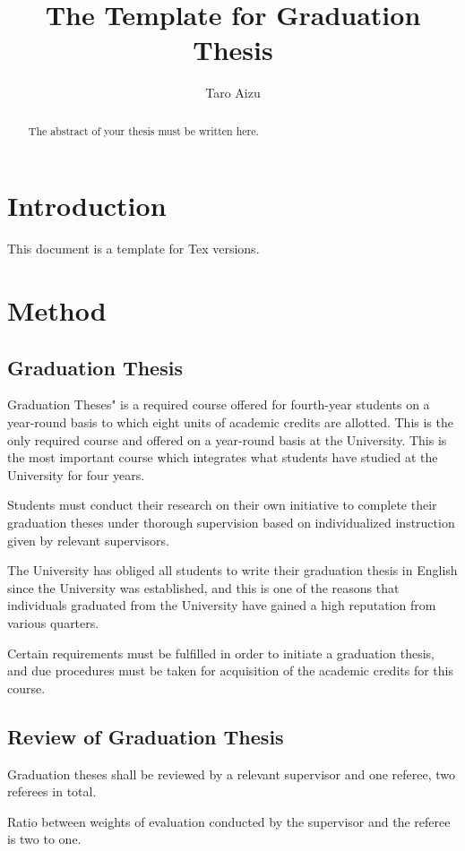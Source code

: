 \documentclass[ams]{U-AizuGT}
\author{Taro Aizu}
\title{The Template for Graduation Thesis}
\begin{document}
	\maketitle
	\begin{abstract}
		The abstract of your thesis must be written here.
	\end{abstract}
	
	\section{Introduction}
		This document is a template for Tex versions.
	
	\section{Method}
		\subsection{Graduation Thesis}
			Graduation Theses" is a required course offered for fourth-year students on a year-round basis to which eight units of academic credits are allotted. This is the only required course and offered on a year-round basis at the University. This is the most important course which integrates what students have studied at the University for four years.
			
			Students must conduct their research on their own initiative to complete their graduation theses under thorough supervision based on individualized instruction given by relevant supervisors.
			
			The University has obliged all students to write their graduation thesis in English since the University was established, and this is one of the reasons that individuals graduated from the University have gained a high reputation from various quarters.
			
			Certain requirements must be fulfilled in order to initiate a graduation thesis, and due procedures must be taken for acquisition of the academic credits for this course.
			
		\subsection{Review of Graduation Thesis}
			Graduation theses shall be reviewed by a relevant supervisor and one referee, two referees in total.
			
			Ratio between weights of evaluation conducted by the supervisor and the referee is two to one.
			
\end{document}
